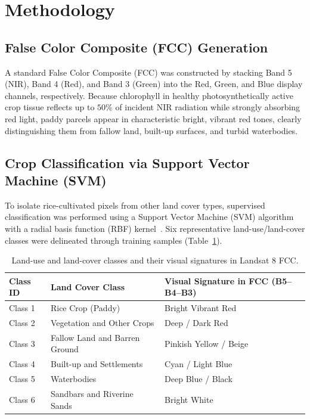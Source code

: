 \documentclass[11pt,a4paper]{article}
\begin{document}
\section{Methodology}

\subsection{False Color Composite (FCC) Generation}
A standard False Color Composite (FCC) was constructed by stacking Band 5 (NIR), Band 4 (Red), and Band 3 (Green) into the Red, Green, and Blue display channels, respectively. Because chlorophyll in healthy photosynthetically active crop tissue reflects up to $50\%$ of incident NIR radiation while strongly absorbing red light, paddy parcels appear in characteristic bright, vibrant red tones, clearly distinguishing them from fallow land, built-up surfaces, and turbid waterbodies.

\subsection{Crop Classification via Support Vector Machine (SVM)}
To isolate rice-cultivated pixels from other land cover types, supervised classification was performed using a Support Vector Machine (SVM) algorithm with a radial basis function (RBF) kernel~\cite{mountrakis2011support}. Six representative land-use/land-cover classes were delineated through training samples (Table~\ref{tab:classes}).

\begin{table}[H]
\centering
\caption{Land-use and land-cover classes and their visual signatures in Landsat 8 FCC.}
\label{tab:classes}
\small
\begin{tabular}{lll}
\toprule
\textbf{Class ID} & \textbf{Land Cover Class} & \textbf{Visual Signature in FCC (B5--B4--B3)} \\
\midrule
Class 1 & Rice Crop (Paddy) & Bright Vibrant Red \\
Class 2 & Vegetation and Other Crops & Deep / Dark Red \\
Class 3 & Fallow Land and Barren Ground & Pinkish Yellow / Beige \\
Class 4 & Built-up and Settlements & Cyan / Light Blue \\
Class 5 & Waterbodies & Deep Blue / Black \\
Class 6 & Sandbars and Riverine Sands & Bright White \\
\bottomrule
\end{tabular}
\end{table}
\end{document}
